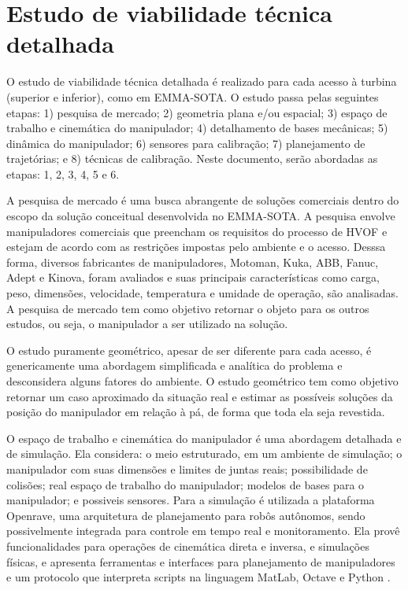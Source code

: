 \section{Estudo de viabilidade técnica detalhada}\label{sec::viatec} 

O estudo de viabilidade técnica detalhada é realizado para cada acesso à turbina
(superior e inferior), como em EMMA-SOTA. O estudo passa pelas
seguintes etapas: 1) pesquisa de mercado; 2) geometria plana e/ou espacial; 3)
espaço de trabalho e cinemática do manipulador; 4) detalhamento de
bases mecânicas; 5) dinâmica do manipulador; 6) sensores para calibração; 7)
planejamento de trajetórias; e 8) técnicas de calibração.
Neste documento, serão abordadas as etapas: 1, 2, 3, 4, 5 e 6.

A pesquisa de mercado é uma busca abrangente de soluções comerciais dentro do
escopo da solução conceitual desenvolvida no EMMA-SOTA. A pesquisa envolve
manipuladores comerciais que preencham os requisitos do processo de HVOF e
estejam de acordo com as restrições impostas pelo ambiente e o acesso. Desssa
forma, diversos fabricantes de manipuladores, Motoman, Kuka, ABB, Fanuc,
Adept e Kinova, foram avaliados e suas principais características como carga,
peso, dimensões, velocidade, temperatura e umidade de operação, são analisadas.
A pesquisa de mercado tem como objetivo retornar o objeto para os outros
estudos, ou seja, o manipulador a ser utilizado na solução.

O estudo puramente geométrico, apesar de ser diferente para cada acesso, é
genericamente uma abordagem simplificada e analítica do problema e desconsidera
alguns fatores do ambiente. O estudo geométrico tem como objetivo retornar um caso
aproximado da situação real e estimar as possíveis soluções da posição do
manipulador em relação à pá, de forma que toda ela seja revestida.

O espaço de trabalho e cinemática do manipulador é uma abordagem
detalhada e de simulação. Ela considera: o meio estruturado, em um ambiente de
simulação; o manipulador com suas dimensões e limites de juntas reais;
possibilidade de colisões; real espaço de trabalho do manipulador; modelos de
bases para o manipulador; e possiveis sensores. Para a simulação é utilizada a
plataforma Openrave, uma arquitetura de planejamento para robôs autônomos,
sendo possivelmente integrada para controle em tempo real e monitoramento.
Ela provê funcionalidades para operações de cinemática direta e inversa, e
simulações físicas, e apresenta ferramentas e interfaces para planejamento de
manipuladores e um protocolo que interpreta scripts na linguagem MatLab, Octave
e Python \citep{diankov2008openrave}.

